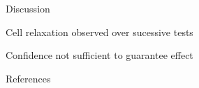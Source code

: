 \documentclass[a0paper,portrait]{baposter}
\begin{document}
\begin{poster}
\begin{posterbox}[name=discuss,column=1,above=bottom]{Discussion}
  \begin{center}
  \begin{description}
    \item [Cell relaxation observed over sucessive tests]
  \end{description}
  
  \begin{description}
    \item [Confidence not sufficient to guarantee effect]
  \end{description}
  
  \end{center}
\end{posterbox}

\begin{posterbox}[name=refs,column=2,below=results,above=bottom]{References}
  \renewcommand*{\bibfont}{\scriptsize}
  \printbibliography[heading=none]
\end{posterbox}

\end{poster}
\end{document}
